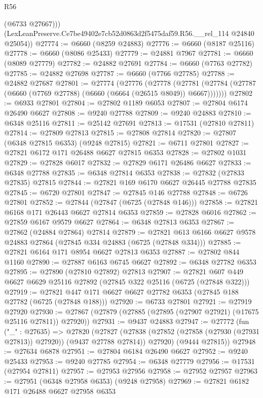 \begin{lexlean}{R56}
\begin{coremodule}
          (@6733 @27667)))
      (LexLeanPreserve.Ce7be49402e7cb52d0863d2f5475daf59.R56.__rel_114 @24840 @25054))
@27774 := @6660 (@8259 @24883)
@27776 := @6660 (@8187 @25116)
@27778 := @6660 (@8086 @25433)
@27779 := @24881 @7967
@27781 := @6660 (@8089 @27779)
@27782 := @24882 @27691
@27784 := @6660 (@7763 @27782)
@27785 := @24882 @27698
@27787 := @6660 (@7766 @27785)
@27788 := @24882 @27687
@27801 := @27774
    (@27776
      (@27778
        (@27781 (@27784 (@27787 (@6660 (@7769 @27788) (@6660 (@6664 (@26515 @8049)) @6667)))))))
@27802 := @6933 @27801
@27804 := @27802 @1189 @6053
@27807 := @27804 @6174 @26490 @6627
@27808 := @9240 @27788
@27809 := @9240 @24883
@27810 := @6348 @25116
@27811 := @25142 @27691
@27813 := @17531 (@27810 @27811)
@27814 := @27809 @27813
@27815 := @27808 @27814
@27820 := @27807 (@6348 @27815 @6353) (@9248 @27815)
@27821 := @6711 @27801
@27827 := @27821 @6172 @171 @26488 @6627 @27815 @6353
@27828 := @27802 @1031
@27829 := @27828 @6017
@27832 := @27829 @6171 @26486 @6627
@27833 := @6348 @27788
@27835 := @6348 @27814 @6353
@27838 := @27832 (@27833 @27835) @27815
@27844 := @27821 @169 @6170 @6627 @26445 @27788 @27835
@27845 := @6720 @27801
@27847 := @27845 @146 @27788
@27848 := @6726 @27801
@27852 := @27844 (@27847 (@6725 (@27848 @146)))
@27858 := @27821 @6168 @171 @26443 @6627 @27814 @6353
@27859 := @27828 @6016
@27862 := @27859 @6167 @9579 @6627
@27864 := @6348 @27813 @6353
@27867 := @27862 (@24884 @27864) @27814
@27879 := @27821 @613 @6166 @6627 @9578 @24883 @27864 (@27845 @334 @24883 (@6725 (@27848 @334)))
@27885 := @27821 @6164 @171 @8954 @6627 @27813 @6353
@27887 := @27802 @844 @1160
@27890 := @27887 @6163 @6745 @6627
@27892 := @6348 @27782 @6353
@27895 := @27890 (@27810 @27892) @27813
@27907 := @27821 @607 @449 @6627 @6629 @25116 @27892 (@27845 @322 @25116 (@6725 (@27848 @322)))
@27919 := @27821 @447 @171 @6627 @6627 @27782 @6353 (@27845 @188 @27782 (@6725 (@27848 @188)))
@27920 := @6733 @27801
@27921 := @27919 @27920
@27930 := @27867 (@27879 (@27885 (@27895 (@27907 @27921) (@17675 @25116 @27811)) @27920))
@27931 := @9437 @24883
@27947 := @27772
    (fun ("_" : @27635) =>
    @27820
      (@27827
        (@27838 (@27852 (@27858 (@27930 (@27931 @27813)) @27920)) (@9437 @27788 @27814))
        @27920)
      (@9444 @27815))
@27948 := @27634 @6878
@27951 := @27804 @6184 @26490 @6627
@27952 := @9240 @25433
@27953 := @9240 @27785
@27954 := @6348 @27779
@27956 := @17531 (@27954 @27811)
@27957 := @27953 @27956
@27958 := @27952 @27957
@27963 := @27951 (@6348 @27958 @6353) (@9248 @27958)
@27969 := @27821 @6182 @171 @26488 @6627 @27958 @6353

\end{coremodule}
\end{lexlean}
